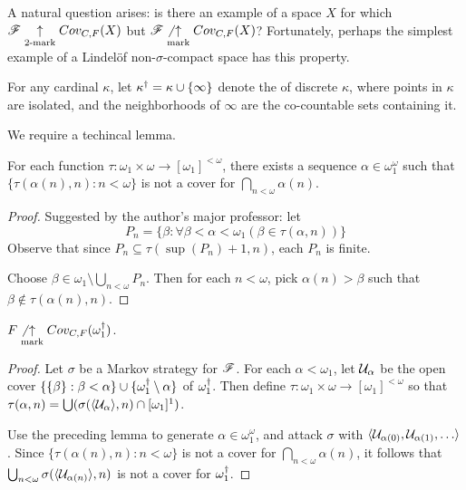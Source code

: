 A natural question arises: is there an example of a space $X$ for which
$\mathscr{F}\underset{2\text{-mark}}{\uparrow}Cov_{C,F}(X)$ but $\mathscr{F}\not\underset{\text{mark}}{\uparrow}Cov_{C,F}(X)$? Fortunately,
perhaps the simplest example of a Lindel\"of non-$\sigma$-compact
space has this property.

\begin{defn}
  For any cardinal $\kappa$, let $\kappa^\dagger=\kappa\cup\{\infty\}$ denote
  the  of discrete $\kappa$, where points in
  $\kappa$ are isolated, and the neighborhoods of $\infty$ are the co-countable
  sets containing it.
\end{defn}

We require a techincal lemma.

\begin{lem}
  For each function
  $\tau:\omega_1\times\omega \rightarrow [\omega_1]^{<\omega}$,
  there exists a sequence $\alpha\in\omega_1^\omega$
  such that $\{\tau(\alpha(n),n): n<\omega\}$ is not a cover for
  $\bigcap_{n<\omega}\alpha(n)$.
\end{lem}

\begin{proof}
  Suggested by the author's major professor: let
    \[
      P_n =
      \{
        \beta : \forall \beta <\alpha < \omega_1 ( \beta \in \tau(\alpha, n))
      \}
    \]
  Observe that since
  $P_n \subseteq \tau(\sup(P_n)+1, n)$, each $P_n$ is finite.

  Choose $\beta \in\omega_1\setminus \bigcup_{n<\omega} P_n$. Then for each
  $n<\omega$, pick $\alpha(n)>\beta$ such that
  $\beta \not\in \tau(\alpha(n),n)$.
\end{proof}

\begin{thm}
  $F\not\underset{\text{mark}}{\uparrow}Cov_{C,F}(\omega_1^\dagger)$.
\end{thm}

\begin{proof}
  Let $\sigma$ be a Markov strategy for $\mathscr{F}$. For each $\alpha<\omega_1$,
  let $\mathcal{U}_\alpha$ be the open cover
  $\{\{\beta\}:\beta<\alpha\}\cup\{\omega_1^\dagger\setminus\alpha\}$ of
  $\omega_1^\dagger$. Then define
  $\tau:\omega_1\times\omega \rightarrow [\omega_1]^{<\omega}$ so that
  $\tau(\alpha,n)=\bigcup(\sigma(\langle\mathcal{U}_\alpha\rangle,n)\cap[\omega_1]^1)$.

  Use the preceding lemma to generate $\alpha\in\omega_1^\omega$, and attack
  $\sigma$ with $\<\mc U_{\alpha(0)}, \mc U_{\alpha(1)},\dots\>$.
  Since $\{\tau(\alpha(n),n): n<\omega\}$ is not a cover for
  $\bigcap_{n<\omega}\alpha(n)$, it follows that
  $\bigcup_{n<\omega}\sigma(\langle\mathcal{U}_{\alpha(n)}\rangle,n)$ is not a cover for
  $\omega_1^\dagger$.
\end{proof}


